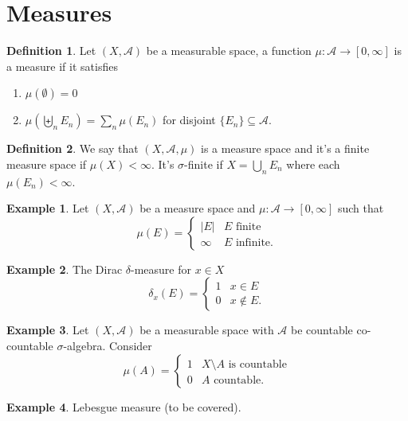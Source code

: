\documentclass[letterpaper,12pt]{article}
\theoremstyle{definition}
\newtheorem{definition}{Definition}[section]
\newtheorem{example}{Example}[section]
\theoremstyle{plain}
\theoremstyle{remark}
\begin{document}
\section{Measures}
\begin{definition}
Let $(X,\mathcal{A})$ be a measurable space, a function $\mu:\mathcal{A}\to[0,\infty]$ is a measure if it satisfies
\begin{enumerate}
  \item $\mu(\emptyset)=0$
  \item $\mu \left(\biguplus_n E_n\right) = \sum_n \mu(E_n)$ for disjoint $\{E_n\}\subseteq \mathcal{A}$.
\end{enumerate}
\end{definition}

\begin{definition}
We say that $(X,\mathcal{A},\mu)$ is a measure space and it's a finite measure space if $\mu(X)<\infty$. It's $\sigma$-finite if $X=\bigcup_n E_n$ where each $\mu(E_n)<\infty$.
\end{definition}

\begin{example}
Let $(X,\mathcal{A})$ be a measure space and $\mu:\mathcal{A}\to[0,\infty]$ such that
\[
\mu(E) = \begin{cases}
|E| & E \text{ finite} \\
\infty & E\text{ infinite.}
\end{cases}
\]
\end{example}

\begin{example}
The Dirac $\delta$-measure for $x\in X$
\[
\delta_x(E) = \begin{cases}
1 & x\in E \\
0 & x\notin E.
\end{cases}
\]
\end{example}

\begin{example}
Let $(X,\mathcal{A})$ be a measurable space with $\mathcal{A}$ be countable co-countable $\sigma$-algebra. Consider
\[\mu(A) = \begin{cases}
1 & X\setminus A\text{ is countable} \\
0 & A \text{ countable.}
\end{cases}\]
\end{example}

\begin{example}
Lebesgue measure (to be covered).
\end{example}
\end{document}
